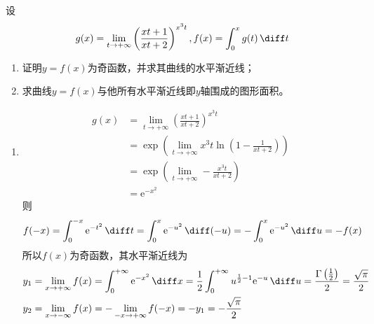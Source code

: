 \begin{example}
    设
    \[ g(x)=\lim_{t\to+\infty}\left(\frac{xt+1}{xt+2}\right)^{x^3t}, f(x)=\int_0^x g(t)\,\diff t \]
    \begin{enumerate}[(1)]
        \item 证明$y=f(x)$为奇函数，并求其曲线的水平渐近线；
        \item 求曲线$y=f(x)$与他所有水平渐近线即$y$轴围成的图形面积。
    \end{enumerate}
\end{example}
\begin{solution}
    \begin{enumerate}[(1)]
        \item
              \begin{align*}
                  g(x) & =\lim_{t\to+\infty}\left(\frac{xt+1}{xt+2}\right)^{x^3t}                  \\
                       & =\exp\left(\lim_{t\to+\infty} x^3t\ln\left(1-\frac{1}{xt+2}\right)\right) \\
                       & =\exp\left(\lim_{t\to+\infty} -\frac{x^3t}{xt+2}\right)                   \\
                       & =\mathrm{e}^{-x^2}
              \end{align*}
              则
              \[
                  f(-x)
                  = \int_0^{-x}\mathrm{e}^{-t^2}\,\diff t
                  = \int_0^{x}\mathrm{e}^{-u^2}\,\diff (-u)
                  = -\int_0^{x}\mathrm{e}^{-u^2}\,\diff u
                  = -f(x)
              \]
              所以$f(x)$为奇函数，其水平渐近线为
              \begin{align*}
                  y_1
                   & = \lim_{x\to+\infty} f(x)
                  = \int_0^{+\infty} \mathrm{e}^{-x^2}\,\diff x
                  = \frac{1}{2}\int_0^{+\infty} u^{\frac{1}{2}-1}\mathrm{e}^{-u}\,\diff u
                  = \frac{\Gamma\left(\frac{1}{2}\right)}{2}
                  = \frac{\sqrt{\pi}}{2}       \\
                  y_2
                   & = \lim_{x\to-\infty} f(x)
                  = - \lim_{-x\to+\infty} f(-x)
                  = -y_1 = -\frac{\sqrt{\pi}}{2}
              \end{align*}


\end{enumerate}
\end{solution}
